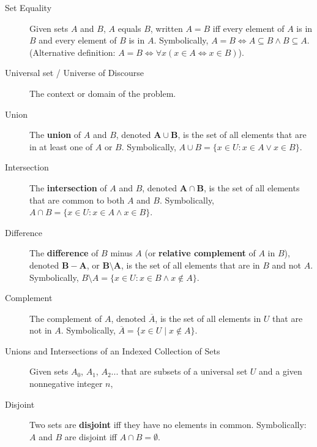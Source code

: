 \documentclass{article}
\begin{document}
\begin{description}
    \item[Set Equality]Given sets $A$ and $B$, $A$ equals $B$, written $A=B$ iff every element of $A$ is in $B$ and every element of $B$ is in $A$. Symbolically, $A=B\Leftrightarrow A\subseteq B\land B\subseteq A$. (Alternative definition: $A=B \Leftrightarrow\forall x(x\in A\Leftrightarrow x\in B)$).
    \item[Universal set / Universe of Discourse] The context or domain of the problem.
    \item[Union] The \textbf{union} of $A$ and $B$, denoted $\mathbf{A}\cup\mathbf{B}$, is the set of all elements that are in at least one of $A$ or $B$. Symbolically, $A\cup B=\{x\in U: x\in A \lor x\in B\}$.
    \item[Intersection] The \textbf{intersection} of $A$ and $B$, denoted $\mathbf{A}\cap\mathbf{B}$, is the set of all elements that are common to both $A$ and $B$. Symbolically, $A\cap B=\{x\in U:x\in A \land x\in B\}$.
    \item[Difference]The \textbf{difference} of $B$ minus $A$ (or \textbf{relative complement} of $A$ in $B$), denoted $\mathbf{B}-\mathbf{A}$, or $\mathbf{B}\setminus\mathbf{A}$, is the set of all elements that are in $B$ and not $A$. Symbolically, $B\setminus A=\{x\in U:x\in B\land x\not\in A\}$.
    \item[Complement]The complement of $A$, denoted $\overline{A}$, is the set of all elements in $U$ that are not in $A$. Symbolically, $\overline{A}=\{x\in U\;|\;x\not\in A\}$.
    \item[Unions and Intersections of an Indexed Collection of Sets] Given sets $A_{0}$, $A_{1}$, $A_{2}$... that are subsets of a universal set $U$ and a given nonnegative integer $n$, 
    \begin{description}
    	\item \[\bigcup_{i=0}^{n} A_{i}=\{x\in U\;|\;x\in A_{i} \text{ for at least one }i=0,1,2,\dots,n \}\]
		\item \[\bigcup_{i=0}^{\infty}A_{i}=\{x\in U\; |\;x\in A_{i} \text{ for at least one nonnegative integer }i\}  \]
		\item \[\bigcap_{i=0}^{n}A_{i}=\{x\in U\;|\;x\in A_{i} \text{ for all }i=0,1,2,\dots,n\}\]
		\item \[\bigcap_{i=0}^{\infty}A_{i}=\{x\in U\;|\;x\in A_{i} \text{ for all nonnegative integers }i\}\]
    \end{description}
    \vspace{0.1cm}
    \item[Disjoint]Two sets are \textbf{disjoint} iff they have no elements in common. Symbolically: $A$ and $B$ are disjoint iff $A\cap B=\emptyset$.

\end{description}
\end{document}
